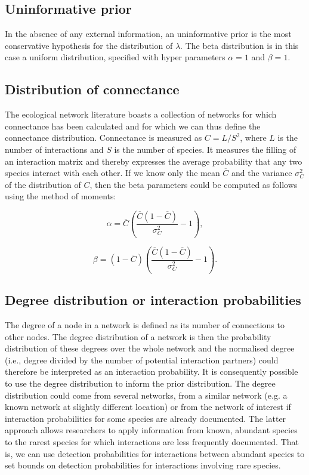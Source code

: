\documentclass[12pt]{article}
\begin{document}
    \subsection*{Uninformative prior}
      
        In the absence of any external information, an uninformative prior is the most conservative hypothesis for the distribution of $\lambda$. The beta distribution is in this case a uniform distribution, specified with hyper parameters $\alpha=1$ and $\beta=1$. 

    \subsection*{Distribution of connectance}
      
        The ecological network literature boasts a collection of networks for which connectance has been calculated and for which we can thus define the connectance distribution. Connectance is measured as $C = L/S^2$, where $L$ is the number of interactions and $S$ is the number of species. It measures the filling of an interaction matrix and thereby expresses the average probability that any two species interact with each other. If we know only the mean $\overline{C}$ and the variance $\sigma_C^2$ of the distribution of $C$, then the beta parameters could be computed as follows using the method of moments:

        \begin{equation}
        \alpha = \overline{C}(\frac{\overline{C}(1-\overline{C})}{\sigma_C^2}-1) ,
        \end{equation}

        \begin{equation}
        \beta = (1-\overline{C})(\frac{\overline{C}(1-\overline{C})}{\sigma_C^2}-1) .
        \end{equation}
  

    \subsection*{Degree distribution or interaction probabilities}

        The degree of a node in a network is defined as its number of connections to other nodes. The degree distribution of a network is then the probability distribution of these degrees over the whole network and the normalised degree (i.e., degree divided by the number of potential interaction partners) could therefore be interpreted as an interaction probability. It is consequently possible to use the degree distribution to inform the prior distribution. The degree distribution could come from several networks, from a similar network (e.g. a known network at slightly different location) or from the network of interest if interaction probabilities for some species are already documented. The latter approach allows researchers to apply information from known, abundant species to the rarest species for which interactions are less frequently documented. That is, we can use detection probabilities for interactions between abundant species to set bounds on detection probabilities for interactions involving rare species.
\end{document}
